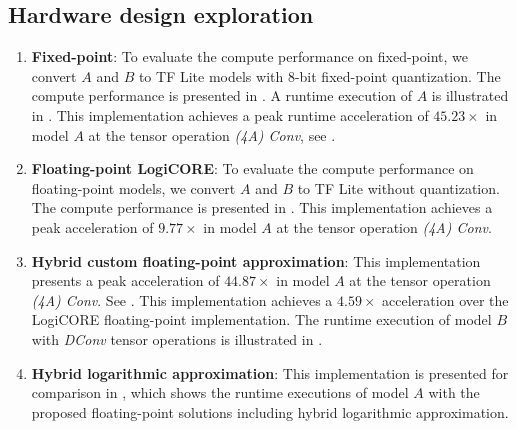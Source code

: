 \subsection{Hardware design exploration}
\begin{enumerate}
\item{\textbf{Fixed-point}}: To evaluate the compute performance on fixed-point, we convert $A$ and $B$ to TF Lite models with 8-bit fixed-point quantization. The compute performance is presented in . A runtime execution of $A$ is illustrated in . This implementation achieves a peak runtime acceleration of $45.23\times$ in model $A$ at the tensor operation \emph{(4A) Conv}, see .

\item{\textbf{Floating-point LogiCORE}}: To evaluate the compute performance on floating-point models, we convert $A$ and $B$ to TF Lite without quantization. The compute performance is presented in .
This implementation achieves a peak acceleration of $9.77\times$ in model $A$ at the tensor operation \emph{(4A) Conv}.

\item{\textbf{Hybrid custom floating-point approximation}}: This implementation presents a peak acceleration of $44.87\times$ in model $A$ at the tensor operation \emph{(4A) Conv}. See . This implementation achieves a $4.59\times$ acceleration over the LogiCORE floating-point implementation. The runtime execution of model $B$ with \emph{DConv} tensor operations is illustrated in .

\item{\textbf{Hybrid logarithmic approximation}}: This implementation is presented for comparison in , which shows the runtime executions of model $A$ with the proposed floating-point solutions including hybrid logarithmic approximation.
\end{enumerate}

